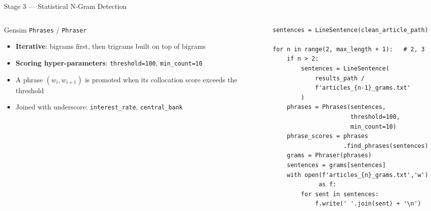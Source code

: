 \documentclass[11pt,aspectratio=169,professionalfonts]{beamer}
\begin{document}
%
%
\begin{frame}[fragile]{Stage 3 — Statistical N-Gram Detection}
  \begin{columns}[T]
    \begin{column}{0.45\textwidth}
      \begin{block}{Gensim \texttt{Phrases} / \texttt{Phraser}}
        \begin{itemize}
          \item \textbf{Iterative}: bigrams first, then
                trigrams built on top of bigrams
          \item \textbf{Scoring hyper-parameters}:
                \texttt{threshold=100},
                \texttt{min\_count=10}
          \item A phrase $(w_i, w_{i+1})$ is promoted when
                its collocation score exceeds the threshold
          \item Joined with underscore:
                \texttt{interest\_rate},
                \texttt{central\_bank}
        \end{itemize}
      \end{block}
    \end{column}
    \begin{column}{0.55\textwidth}
\scriptsize
\begin{lstlisting}
sentences = LineSentence(clean_article_path)

for n in range(2, max_length + 1):   # 2, 3
    if n > 2:
        sentences = LineSentence(
            results_path /
            f'articles_{n-1}_grams.txt'
        )
    phrases = Phrases(sentences,
                      threshold=100,
                      min_count=10)
    phrase_scores = phrases
                    .find_phrases(sentences)
    grams = Phraser(phrases)
    sentences = grams[sentences]
    with open(f'articles_{n}_grams.txt','w') 
             as f:
        for sent in sentences:
            f.write(' '.join(sent) + '\n')
\end{lstlisting}
    \end{column}
  \end{columns}

\end{frame}
%
\end{document}
